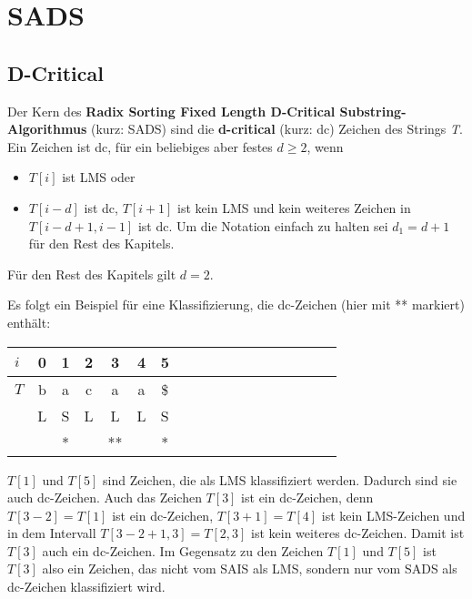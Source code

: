 \section{SADS}
\subsection{D-Critical}
\label{dc}


Der  Kern des \textbf{Radix Sorting Fixed Length D-Critical Substring-Algorithmus}\cite[Kap.~4]{saca:6} (kurz: SADS) sind die \textbf{d-critical} (kurz: dc) Zeichen des Strings \textit{T}. Ein Zeichen ist dc, für ein beliebiges aber festes $d \geq 2$, wenn
\begin{itemize}
    \item $T[i]$ ist LMS oder
    \item $T[i-d]$ ist dc, $T[i+1]$ ist kein LMS und kein weiteres Zeichen in $T[i-d+1,i-1]$ ist dc. Um die Notation einfach zu halten sei $d_1=d+1$ für den Rest des Kapitels.
\end{itemize}

\noindent Für den Rest des Kapitels gilt $d=2$.

\noindent Es folgt ein Beispiel für eine Klassifizierung, die dc-Zeichen (hier mit ** markiert) enthält:

\begin{center}
  \begin{tabular}{ | l | c | c| c| c| c| c| c| c| c| c| c| c| c| c| c| c| c | }
    \hline
        $i$ & 0 & 1 & 2 & 3 & 4 & 5 \\ \hline
        $T$ & b & a & c & a & a & \$ \\ \hline
        $ $ & L & S & L & L & L & S \\ \hline
      	$ $ & & * & & ** & & * \\
    \hline
  \end{tabular}
\end{center}
\bigskip

\noindent $T[1]$ und $T[5]$ sind Zeichen, die als LMS klassifiziert werden. Dadurch sind sie auch dc-Zeichen. Auch das Zeichen $T[3]$ ist ein dc-Zeichen, denn $T[3 - 2] = T[1]$ ist ein dc-Zeichen, $T[3 + 1] = T[4]$ ist kein LMS-Zeichen und in dem Intervall $T[3-2+1,3] = T[2,3]$ ist kein weiteres dc-Zeichen. Damit ist $T[3]$ auch ein dc-Zeichen. Im Gegensatz zu den Zeichen $T[1]$ und $T[5]$ ist $T[3]$ also ein Zeichen, das nicht vom SAIS als LMS, sondern nur vom SADS als dc-Zeichen klassifiziert wird.

